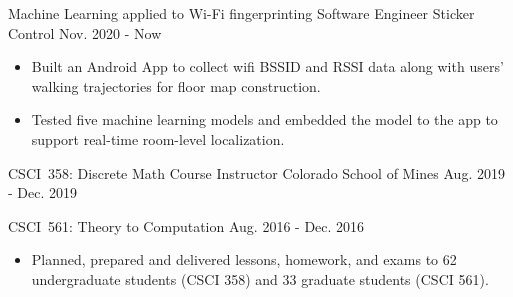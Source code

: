 

\begin{cventries}
	
	\cventry
	{Machine Learning applied to Wi-Fi fingerprinting} %
	{Software Engineer} %
	{Sticker Control} %
	{Nov. 2020 - Now} %
	{\vspace{-.16in}
	\begin{itemize}[leftmargin=*]
		\item Built an Android App to collect wifi BSSID and RSSI data along with users' walking trajectories for floor map construction.
		\item Tested five machine learning models and embedded the model to the app to support real-time room-level localization.
		\vspace{-.16in}
	\end{itemize}}
	
	\cventry
	{CSCI~358: Discrete Math} %
	{Course Instructor} %
	{Colorado School of Mines} %
	{Aug. 2019 - Dec. 2019} %
	{\quad}

	\vspace{-.4in}\cventry	
	{CSCI~561: Theory to Computation} %
	{\quad} %
	{\quad} %
	{Aug. 2016 - Dec. 2016} %
	{\vspace{-.16in}
		\begin{itemize}[leftmargin=*]
			\item Planned, prepared and delivered lessons, homework, and exams to 62 undergraduate students (CSCI 358) and 33 graduate students (CSCI 561).
			\vspace{-.16in}
	\end{itemize}}
	
	
\end{cventries}
